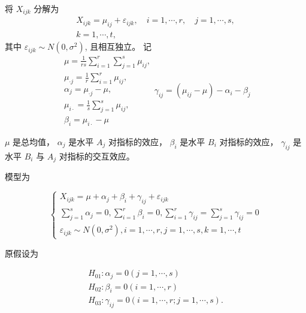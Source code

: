 将 $  {X}_{i j k}  $ 分解为
\begin{equation}
\begin{array}{c}
X_{i j k}=\mu_{i j}+\varepsilon_{i j k}, \quad i=1, \cdots, r, \quad j=1, \cdots, s, \\
k=1, \cdots, t,
\end{array}
\end{equation}
其中 $  \varepsilon_{i j k} \sim N\left(0, \sigma^{2}\right)  $, 且相互独立。  记
\begin{equation}
\begin{array}{l}
\mu=\frac{1}{r s} \sum_{i=1}^{r} \sum_{j=1}^{s} \mu_{i j}, \\ \mu_{\cdot j}=\frac{1}{r} \sum_{i=1}^{r} \mu_{i j}, \\
 \alpha_{j}=\mu_{\cdot j}-\mu, \\
\mu_{i \cdot}=\frac{1}{s} \sum_{j=1}^{s} \mu_{i j} ,\\ 
 \beta_{i}=\mu_{i \cdot}-\mu
\end{array}
\gamma_{i j}=\left(\mu_{i j}-\mu\right)-\alpha_{i}-\beta_{j}
\end{equation}

$  \mu  $ 是总均值， $  \alpha_{j}  $ 是水平 $  A_{j}  $ 对指标的效应， $  \beta_{i}  $ 是水平 $  {B}_{i}  $
对指标的效应， $  \gamma_{i j}  $ 是水平 $  B_{i}  $ 与 $  A_{j}  $ 对指标的交互效应。 

模型为

\begin{equation} \left\{\begin{array}{l}{X}_{i j k}=\mu+{\alpha}_{j}+\beta_{i}+\gamma_{i j}+\varepsilon_{i j k} \\ \sum_{j=1}^{s} \alpha_{j}=0, \sum_{i=1}^{r} \beta_{i}=0, \sum_{i=1}^{r} \gamma_{i j}=\sum_{j=1}^{s} \gamma_{i j}=0 \\ \varepsilon_{i j k} \sim N\left(0, \sigma^{2}\right), i=1, \cdots, r, j=1, \cdots, s, k=1, \cdots, t\end{array}\right. \end{equation}

原假设为

\begin{equation}
\begin{array}{l}
H_{01}: \alpha_{j}=0(j=1, \cdots, s) \\
H_{02}: \beta_{i}=0(i=1, \cdots, r) \\
H_{03}: \gamma_{i j}=0(i=1, \cdots, r ; j=1, \cdots, s) .
\end{array}
\end{equation}

